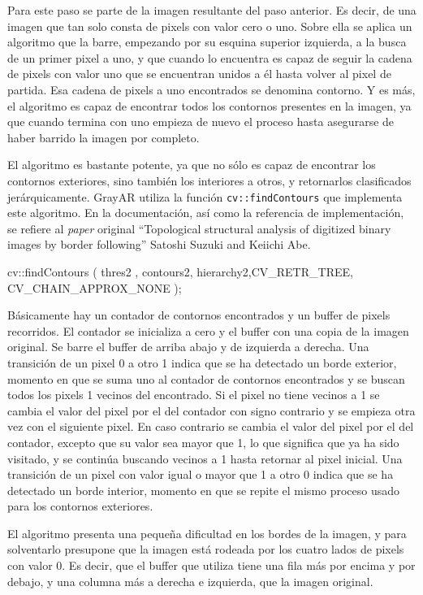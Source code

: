 Para este paso se parte de la imagen resultante del paso anterior. Es decir, de una imagen que tan solo consta de pixels con valor cero o uno. Sobre ella se aplica un algoritmo que la barre, empezando por su esquina superior izquierda, a la busca de un primer pixel a uno, y que cuando lo encuentra es capaz de seguir la cadena de pixels con valor uno que se encuentran unidos a él hasta volver al pixel de partida. Esa cadena de pixels a uno encontrados se denomina contorno. Y es más, el algoritmo es capaz de encontrar todos los contornos presentes en la imagen, ya que cuando termina con uno empieza de nuevo el proceso hasta asegurarse de haber barrido la imagen por completo.

El algoritmo es bastante potente, ya que no sólo es capaz de encontrar los contornos exteriores, sino también los interiores a otros, y retornarlos clasificados jerárquicamente. GrayAR utiliza la función \texttt{cv::findContours} que implementa este algoritmo. En la documentación, así como la referencia de implementación, se refiere al \textit{paper} original ``Topological structural analysis of digitized binary images by border following''  Satoshi Suzuki and Keiichi Abe.

\begin{listing}[]
cv::findContours ( thres2 , contours2, hierarchy2,CV_RETR_TREE, CV_CHAIN_APPROX_NONE );
\end{listing} 

Básicamente hay un contador de contornos encontrados y un buffer de pixels recorridos. El contador se inicializa a cero y el buffer con una copia de la imagen original. Se barre el buffer de arriba abajo y de izquierda a derecha. Una transición de un pixel 0 a otro 1 indica que se ha detectado un borde exterior, momento en que se suma uno al contador de contornos encontrados y se buscan todos los pixels 1 vecinos del encontrado. Si el pixel no tiene vecinos a 1 se cambia el valor del pixel por el del contador con signo contrario y se empieza otra vez con el siguiente pixel. En caso contrario se cambia el valor del pixel por el del contador, excepto que su valor sea mayor que 1, lo que significa que ya ha sido visitado, y se continúa buscando vecinos a 1 hasta retornar al pixel inicial. Una transición de un pixel con valor igual o mayor que 1 a otro 0 indica que se ha detectado un borde interior, momento en que se repite el mismo proceso usado para los contornos exteriores.

El algoritmo presenta una pequeña dificultad en los bordes de la imagen, y para solventarlo presupone que la imagen está rodeada por los cuatro lados de pixels con valor 0. Es decir, que el buffer que utiliza tiene una fila más por encima y por debajo, y una columna más a derecha e izquierda, que la imagen original.

